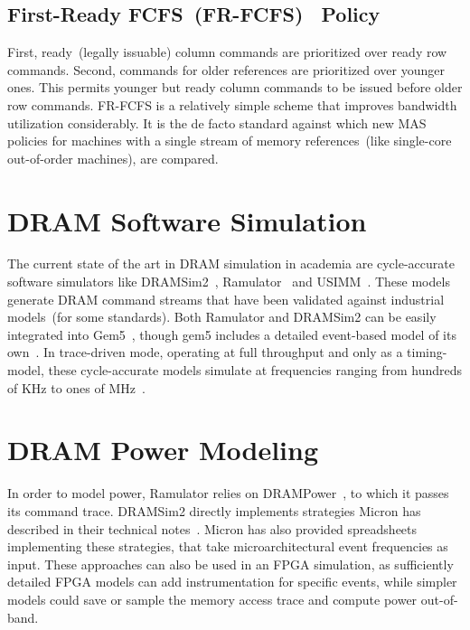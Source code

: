 \subsection{First-Ready FCFS~(FR-FCFS)~\cite{frfcfs} Policy}\label{sec:frfcfs}
First, ready~(legally issuable) column commands are prioritized over ready row
commands. Second, commands for older references are prioritized over younger
ones. This permits younger but ready column commands to be issued before older
row commands. FR-FCFS is a relatively simple scheme that improves bandwidth
utilization considerably. It is the de facto standard against which new MAS
policies for machines with a single stream of memory references~(like
single-core out-of-order machines), are compared.

\section{DRAM Software Simulation}

The current state of the art in DRAM simulation in academia are cycle-accurate
software simulators like DRAMSim2~\cite{dramsim}, Ramulator~\cite{ramulator} and
USIMM~\cite{usimm}. These models generate DRAM command streams that have been
validated against industrial models~(for some standards). Both Ramulator and
DRAMSim2 can be easily integrated into Gem5~\cite{gem5}, though gem5 includes a
detailed event-based model of its own~\cite{gem5event}. In trace-driven mode,
operating at full throughput and only as a timing-model, these cycle-accurate
models simulate at frequencies ranging from hundreds of KHz to ones of
MHz~\cite{ramulator}.

\section{DRAM Power Modeling}

In order to model power, Ramulator relies on DRAMPower~\cite{drampower}, to
which it passes its command trace. DRAMSim2 directly implements strategies
Micron has described in their technical notes~\cite{micronpower}. Micron has
also provided spreadsheets implementing these strategies, that take
microarchitectural event frequencies as input. These approaches can also be
used in an FPGA simulation, as sufficiently detailed FPGA models can add
instrumentation for specific events, while simpler models could save or sample
the memory access trace and compute power out-of-band.
